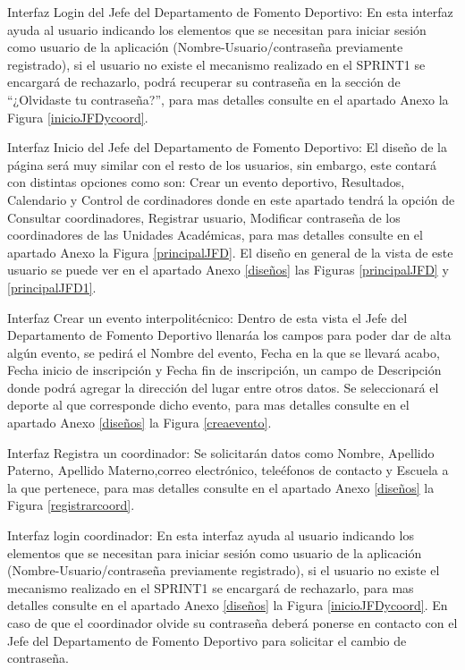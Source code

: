 	\noindent Interfaz Login del Jefe del Departamento de Fomento Deportivo: En esta interfaz ayuda al usuario indicando los elementos que se necesitan para iniciar sesión como usuario de la aplicación (Nombre-Usuario/contraseña previamente registrado), si el usuario no existe el mecanismo realizado en el SPRINT1 se encargará de rechazarlo, podrá recuperar su contraseña en la sección de “¿Olvidaste tu contraseña?”, para mas detalles consulte en el apartado Anexo la Figura 	\ref{inicioJFDycoord}. 
	\newline
	
	\noindent Interfaz Inicio del Jefe del Departamento de Fomento Deportivo: El diseño de la página será muy similar con el resto de los usuarios, sin embargo, este contará con distintas opciones como son: Crear un evento deportivo, Resultados, Calendario y Control de cordinadores donde en este apartado tendrá la opción de Consultar coordinadores, Registrar usuario, Modificar contraseña de los coordinadores de las Unidades Académicas, para mas detalles consulte en el apartado Anexo la Figura 	\ref{principalJFD}. El diseño en general de la vista de este usuario se puede ver en el apartado Anexo \ref{diseños} las Figuras \ref{principalJFD} y \ref{principalJFD1}.
	\newline
	
	\noindent Interfaz Crear un evento interpolitécnico: Dentro de esta vista el Jefe del Departamento de Fomento Deportivo llenaráa los campos para poder dar de alta algún evento, se pedirá el Nombre del evento, Fecha en la que se llevará acabo, Fecha inicio de inscripción y Fecha fin de inscripción, un campo de Descripción donde podrá agregar la dirección del lugar entre otros datos. Se seleccionará el deporte al que corresponde dicho evento, para mas detalles consulte en el apartado Anexo \ref{diseños} la Figura \ref{creaevento}.
	\newline
	
	\noindent Interfaz Registra un coordinador: Se solicitarán datos como Nombre, Apellido Paterno, Apellido Materno,correo electrónico, teleéfonos de contacto y Escuela a la que pertenece, para mas detalles consulte en el apartado Anexo \ref{diseños} la Figura \ref{registrarcoord}.
	
	\noindent Interfaz login coordinador: En esta interfaz ayuda al usuario indicando los elementos que se necesitan para iniciar sesión como usuario de la aplicación (Nombre-Usuario/contraseña previamente registrado), si el usuario no existe el mecanismo realizado en el SPRINT1 se encargará de rechazarlo, para mas detalles consulte en el apartado Anexo \ref{diseños} la Figura \ref{inicioJFDycoord}. En caso de que el coordinador olvide su contraseña deberá ponerse en contacto con el Jefe del Departamento de Fomento Deportivo para solicitar el cambio de contraseña.
	\newline
	
